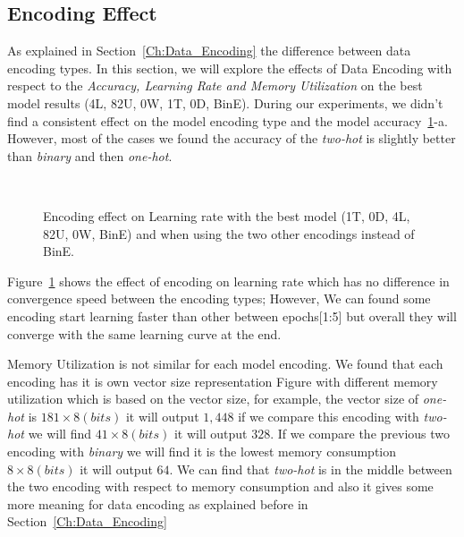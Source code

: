 \subsection{Encoding Effect}

As explained in Section~\ref{Ch:Data_Encoding} the difference between data encoding types. In this section, we will explore the effects of Data Encoding with respect to the \textit{Accuracy, Learning Rate and Memory Utilization} on the best model results (4L, 82U, 0W, 1T, 0D, BinE). During our experiments, we didn't find a consistent effect on the model encoding type and the model accuracy~\ref{Fig:Convergence_Memory}-a. However, most of the cases we found the accuracy of the \textit{two-hot} is slightly better than \textit{binary} and then \textit{one-hot}.


\begin{figure}[!t]
 \centering
 \begin{tikzpicture}
  
 \end{tikzpicture}
 \caption{Encoding effect on Learning rate with the best model (1T, 0D, 4L, 82U, 0W, BinE) and when using the two other encodings instead of BinE.}~\label{Fig:Convergence_Memory}%
\end{figure}


Figure~\ref{Fig:Convergence_Memory} shows the effect of encoding on learning rate which has no difference in convergence speed between the encoding types; However, We can found some encoding start learning faster than other between epochs[1:5] but overall they will converge with the same learning curve at the end.


Memory Utilization is not similar for each model encoding. We found that each encoding has it is own vector size representation Figure with different memory utilization which is based on the vector size, for example, the vector size of \textit{\textit{one-hot}} is $181 \times 8(bits)$ it will output $1,448$ if we compare this encoding with \textit{\textit{two-hot}} we will find $41 \times 8(bits)$ it will output $328$. If we compare the previous two encoding with \textit{\textit{binary}} we will find it is the lowest memory consumption $8 \times 8(bits)$ it will output $64$. We can find that \textit{\textit{two-hot}} is in the middle between the two encoding with respect to memory consumption and also it gives some more meaning for data encoding as explained before in Section~\ref{Ch:Data_Encoding}

